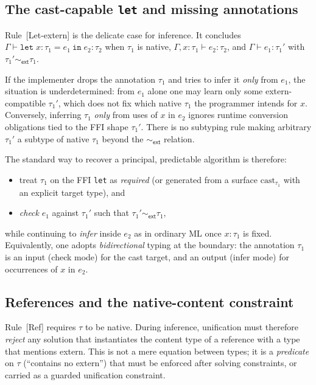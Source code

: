 \documentclass[11pt,a4paper]{article}
\begin{document}
\subsection{The cast-capable \texttt{let} and missing annotations}

Rule~\textsf{[{Let-extern}]} is the delicate case for inference.
It concludes $\Gamma \vdash \texttt{let}\; x{:}\tau_1 = e_1\ \texttt{in}\; e_2 : \tau_2$ when $\tau_1$ is native, $\Gamma, x{:}\tau_1 \vdash e_2 : \tau_2$, and $\Gamma \vdash e_1 : \tau_1'$ with $\tau_1' \sim_{\textsf{ext}} \tau_1$.

If the implementer drops the annotation $\tau_1$ and tries to infer it \emph{only} from $e_1$, the situation is underdetermined: from $e_1$ alone one may learn only some extern-compatible $\tau_1'$, which does not fix which native $\tau_1$ the programmer intends for $x$.
Conversely, inferring $\tau_1$ \emph{only} from uses of $x$ in $e_2$ ignores runtime conversion obligations tied to the FFI shape $\tau_1'$.
There is no subtyping rule making arbitrary $\tau_1'$ a subtype of native $\tau_1$ beyond the $\sim_{\textsf{ext}}$ relation.

The standard way to recover a principal, predictable algorithm is therefore:
\begin{itemize}
  \item treat $\tau_1$ on the FFI \texttt{let} as \emph{required} (or generated from a surface $\text{cast}_{\tau_1}$ with an explicit target type), and
  \item \emph{check} $e_1$ against $\tau_1'$ such that $\tau_1' \sim_{\textsf{ext}} \tau_1$,
\end{itemize}
while continuing to \emph{infer} inside $e_2$ as in ordinary ML once $x : \tau_1$ is fixed.
Equivalently, one adopts \emph{bidirectional} typing at the boundary: the annotation $\tau_1$ is an input (check mode) for the cast target, and an output (infer mode) for occurrences of $x$ in $e_2$.

\subsection{References and the native-content constraint}

Rule~\textsf{[Ref]} requires $\tau$ to be native.
During inference, unification must therefore \emph{reject} any solution that instantiates the content type of a reference with a type that mentions \textsf{extern}.
This is not a mere equation between types; it is a \emph{predicate} on $\tau$ (``contains no \textsf{extern}'') that must be enforced after solving constraints, or carried as a guarded unification constraint.
\end{document}
